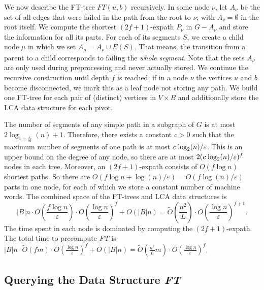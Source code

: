 \documentclass{article}\usepackage[a4paper,margin=20mm]{geometry}
\newcommand*{\Otilde}{\widetilde{O}}
\newcommand*{\nwspace}{\hspace*{.1em}}
\newcommand{\eps}{\varepsilon}
\begin{document}
We now describe the FT-tree $FT(u,b)$ recursively.
In some node $\nu$, let $A_{\nu}$ be the set of all edges
that were failed in the path from the root to $\nu$;
with $A_{\nu} = \emptyset$ in the root itself.
We compute the shortest $(2f{+}1)$-expath $P_{\nu}$ in $G-A_{\nu}$
and store the information for all its parts.
For each of its segments $S$, we create a child node $\mu$ in which we set
$A_{\mu} = A_{\nu} \cup E(S)$.
That means, the transition from a parent to a child corresponds to failing the \emph{whole segment}.
Note that the sets $A_{\nu}$ are only used during preprocessing and never actually stored.
We continue the recursive construction until depth $f$ is reached;
if in a node $\nu$ the vertices $u$ and $b$ become disconnected,
we mark this as a leaf node not storing any path.
We build one FT-tree for each pair of (distinct) vertices in $V \times B$
and additionally store the LCA data structure for each pivot.

The number of segments of any simple path in a subgraph of $G$ is at most
$2\log_{1+ \tfrac{\eps}{36}}(n) +1$.
Therefore, there exists a constant $c > 0$ such that
the maximum number of segments of one path is at most $c \nwspace \log_2(n)/\eps$.
This is an upper bound on the degree of any node,
so there are at most $2(c \nwspace \log_2(n)/\eps)^f$ nodes in each tree.
Moreover, an $(2f{+}1)$-expath consists of $O(f \log n)$
shortest paths.
So there are $O(f\log n+ \log(n)/\eps) = O(f \log (n)/\varepsilon)$ parts in one node,
for each of which we store a constant number of machine words.
The combined space of the FT-trees and LCA data structures is
\begin{equation*}
 |B|n \cdot O\!\left(\frac{f\log n}{\varepsilon}\right) \cdot O\!\left(\frac{\log n}{\varepsilon}\right)^{f} + O(|B|n)
 	= \Otilde\!\left(\frac{n^2}{L}\right)
 		\cdot O\!\left(\frac{\log n}{\varepsilon}\right)^{f+1}.
\end{equation*}
The time spent in each node is dominated by computing the $(2f{+}1)$-expath.
The total time to precompute \emph{FT} is
  $|B|n \cdot \Otilde(fm) \cdot O\!\left(\frac{\log n}{\varepsilon}\right)^f + O(|B|n)
    = \Otilde\!\left(\frac{n^2}{L} m \right) 
    	\cdot O\!\left(\frac{\log n}{\varepsilon}\right)^f$.


\subsection{Querying the Data Structure \texorpdfstring{\emph{FT}}{FT}}
\label{subsec:sublinear_FT_query}
\end{document}
